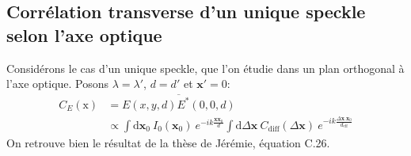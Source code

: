 \subsection{Corrélation transverse d'un unique speckle selon l'axe optique}
Considérons le cas d'un unique speckle, que l'on étudie dans un plan orthogonal à l'axe optique. Posons $\lambda = \lambda'$, $d=d'$ et $\mathbf{x}'=0$:
\begin{align}
C_E(\mathrm{x})&=\overline{E(x,y,d)E^*(0,0,d)}\\
&\propto \int{\mathrm{d}\mathbf{x}_0 \: I_0(\mathbf{x}_0) \: e^{-ik\frac{\mathbf{x} \mathbf{x}_0}{d}} \int{\mathrm{d}\Delta\mathbf{x} \: C_{\mathrm{diff}}(\Delta\mathbf{x})\: e^{-ik\frac{\Delta\mathbf{x}.\mathbf{x}_0}{d_{\mathrm{eff}}}}}}
\end{align}
On retrouve bien le résultat de la thèse de Jérémie, équation C.26.

